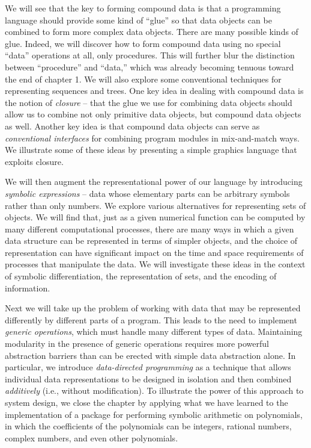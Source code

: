 We will see that the key to forming compound data is that a
programming language should provide some kind of ``glue'' so that data
objects can be combined to form more complex data objects.  There are
many possible kinds of glue.  Indeed, we will discover how to form
compound data using no special ``data'' operations at all, only
procedures.  This will further blur the distinction between
``procedure'' and ``data,'' which was already becoming tenuous toward
the end of chapter 1.  We will also explore some conventional
techniques for representing sequences and trees.  One key idea in
dealing with compound data is the notion of \textit{closure} -- that the
glue we use for combining data objects should allow us to combine not
only primitive data objects, but compound data objects as well.
Another key idea is that compound data objects can serve as \textit{conventional interfaces} for combining program modules in
mix-and-match ways.  We illustrate some of these ideas by presenting a
simple graphics language that exploits closure.

We will then augment the representational power of our language by
introducing \textit{symbolic expressions} -- data whose elementary parts
can be arbitrary symbols rather than only numbers.  We explore various
alternatives for representing sets of objects.  We will find that,
just as a given numerical function can be computed by many different
computational processes, there are many ways in which a given data
structure can be represented in terms of simpler objects, and the
choice of representation can have significant impact on the time and
space requirements of processes that manipulate the data.  We will
investigate these ideas in the context of symbolic differentiation,
the representation of sets, and the encoding of information.

Next we will take up the problem of working with data that may be
represented differently by different parts of a program.  This leads
to the need to implement \textit{generic operations}, which must handle
many different types of data.  Maintaining modularity in the
presence of generic operations requires more powerful abstraction
barriers than can be erected with simple data abstraction alone.  In
particular, we introduce \textit{data-directed programming} as a
technique that allows individual data representations to be designed
in isolation and then combined \textit{additively} (i.e., without
modification).  To illustrate the power of this approach to system
design, we close the chapter by applying what we have learned to the
implementation of a package for performing symbolic arithmetic on
polynomials, in which the coefficients of the polynomials can be
integers, rational numbers, complex numbers, and even other
polynomials.


